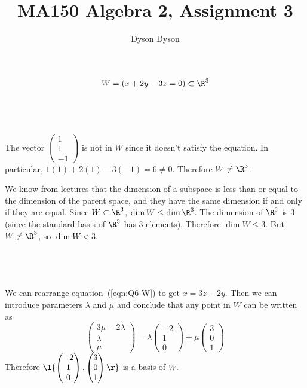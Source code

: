 \documentclass[a4paper]{article}
\title{MA150 Algebra 2, Assignment 3}
\author{Dyson Dyson}
\date{}
\begin{document}
\maketitle

\setlength{\parindent}{0em}
\setlength{\parskip}{1em}


\begin{equation}
W = (x + 2y - 3z = 0) \subset \R^3
\label{eqn:Q6-W}
\end{equation}

\subsection{~}

The vector $\begin{pmatrix}1\\ 1\\ -1\end{pmatrix}$ is not in $W$ since it doesn't satisfy the equation. In particular, $1(1) + 2(1) - 3(-1) = 6 \ne 0$. Therefore $W \ne \R^3$.

We know from lectures that the dimension of a subspace is less than or equal to the dimension of the parent space, and they have the same dimension if and only if they are equal. Since $W \subset \R^3$, $\dim W \le \dim \R^3$. The dimension of $\R^3$ is 3 (since the standard basis of $\R^3$ has 3 elements). Therefore $\dim W \le 3$. But $W \ne \R^3$, so $\dim W < 3$.

\subsection{~}

We can rearrange equation~(\ref{eqn:Q6-W}) to get $x = 3z - 2y$. Then we can introduce parameters $\lambda$ and $\mu$ and conclude that any point in $W$ can be written as $$\begin{pmatrix}3 \mu - 2 \lambda\\ \lambda\\ \mu\end{pmatrix} = \lambda \begin{pmatrix}-2\\ 1\\ 0\end{pmatrix} + \mu \begin{pmatrix}3\\ 0\\ 1\end{pmatrix}$$
Therefore $\l\{ \begin{pmatrix}- 2\\ 1\\ 0\end{pmatrix}, \begin{pmatrix}3\\ 0\\ 1\end{pmatrix} \r\}$ is a basis of $W$.
\end{document}

